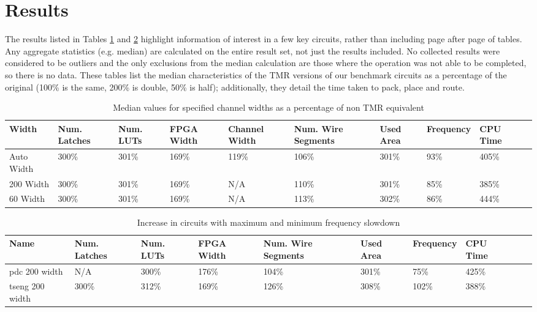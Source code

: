 \documentclass[12pt,final,oneside]{dwThesis} %
\begin{document}
   \section{Results}\label{BenchmarkResults}
   The results listed in Tables \ref{medianRes} and \ref{timing} highlight information of interest in a few key circuits, rather than including page after page of tables. Any aggregate statistics (e.g. median) are calculated on the entire result set, not just the results included. No collected results were considered to be outliers and the only exclusions from the median calculation are those where the operation was not able to be completed, so there is no data.
   These tables list the median characteristics of the \ac{TMR} versions of our benchmark circuits as a percentage of the original (100\% is the same, 200\% is double, 50\% is half); additionally, they detail the time taken to pack, place and route.
   \begin{table}
      \begin{adjustwidth}{-1.0cm}{-1.05cm}
         \begin{tabularx}{1.1\textwidth}{lXXXXXXllX}
            \toprule
            Width & Num. Latches & Num. \acp{LUT} & FPGA Width & Channel Width & Num. Wire Segments & Used Area & Frequency & CPU Time\\
            \midrule
            Auto Width         & 300\% & 301\% & 169\% & 119\% & 106\% & 301\% & 93\% & 405\%\\
            200 Width          & 300\% & 301\% & 169\% & N/A   & 110\% & 301\% & 85\% & 385\%\\
            60 Width           & 300\% & 301\% & 169\% & N/A   & 113\% & 302\% & 86\% & 444\%\\
            \bottomrule
         \end{tabularx}
         \caption{Median values for specified channel widths as a percentage of non \ac{TMR} equivalent}
         \label{medianRes}
      \end{adjustwidth}
   \end{table}

   \begin{table}
      \begin{adjustwidth}{-1cm}{-1.1cm}
         \begin{tabularx}{1.1\textwidth}{lXXXXXXXXX}
            \toprule
            Name & Num. Latches & Num. \acp{LUT} & FPGA Width & Num. Wire Segments & Used Area & Frequency & CPU Time\\
            \midrule
            pdc 200 width   & N/A   & 300\% & 176\% & 104\% & 301\% &  75\% & 425\%\\
            tseng 200 width & 300\% & 312\% & 169\% & 126\% & 308\% &  102\% & 388\%\\
            \bottomrule
         \end{tabularx}
         \caption{Increase in circuits with maximum and minimum frequency slowdown}
         \label{timing}
      \end{adjustwidth}
   \end{table}
\end{document}

